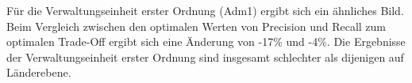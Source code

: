 			Für die Verwaltungseinheit erster Ordnung (Adm1) ergibt sich ein ähnliches Bild. 
			Beim Vergleich zwischen den optimalen Werten von Precision und Recall zum optimalen Trade-Off ergibt sich eine Änderung von -17\% und -4\%.
			Die Ergebnisse der Verwaltungseinheit erster Ordnung sind insgesamt schlechter als dijenigen auf Länderebene. 

			


